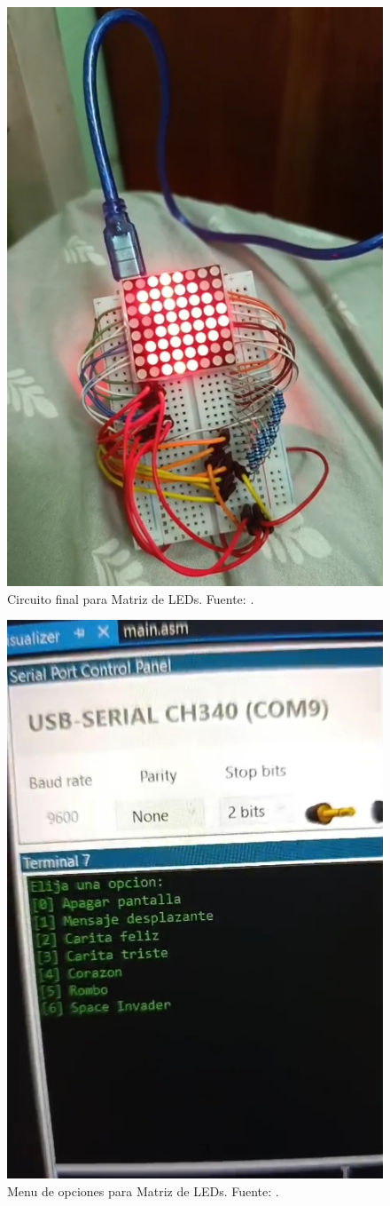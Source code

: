 \begin{figure}[H]
  \centering
  \includegraphics[width=0.7\linewidth]{./Anexos/Resultados/Matriz/Circuito.jpg}
  \caption{Circuito final para Matriz de LEDs. Fuente: \cite{LabDrive}.}
  \label{fig:circuito_matriz}
\end{figure}

\begin{figure}[H]
  \centering
  \includegraphics[width=0.7\linewidth]{./Anexos/Resultados/Matriz/Menu.jpg}
  \caption{Menu de opciones para Matriz de LEDs. Fuente: \cite{LabDrive}.}
  \label{fig:menu_matriz}
\end{figure}



